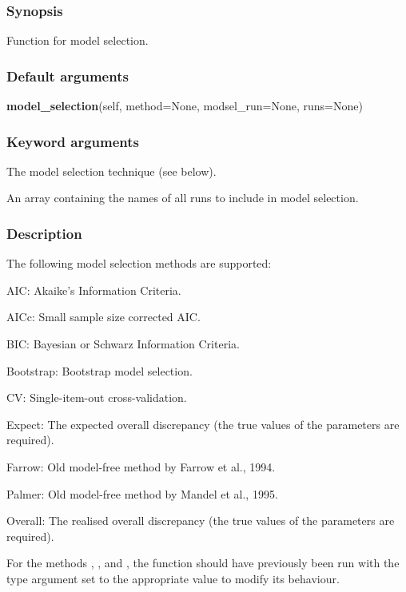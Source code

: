 \subsubsection{Synopsis}

Function for model selection.

\subsubsection{Default arguments}

\textsf{\textbf{model\_selection}(self, method=None, modsel\_run=None, runs=None)}


\subsubsection{Keyword arguments}

  The model selection technique (see below).

  An array containing the names of all runs to include in model selection.

\subsubsection{Description}

The following model selection methods are supported:

AIC:  Akaike's Information Criteria.

AICc:  Small sample size corrected AIC.

BIC:  Bayesian or Schwarz Information Criteria.

Bootstrap:  Bootstrap model selection.

CV:  Single-item-out cross-validation.

Expect:  The expected overall discrepancy (the true values of the parameters are required).

Farrow:  Old model-free method by Farrow et al., 1994.

Palmer:  Old model-free method by Mandel et al., 1995.

Overall:  The realised overall discrepancy (the true values of the parameters are required).

For the methods 
, 
, and 
, the function 
 should have
previously been run with the type argument set to the appropriate value to modify its
behaviour.

